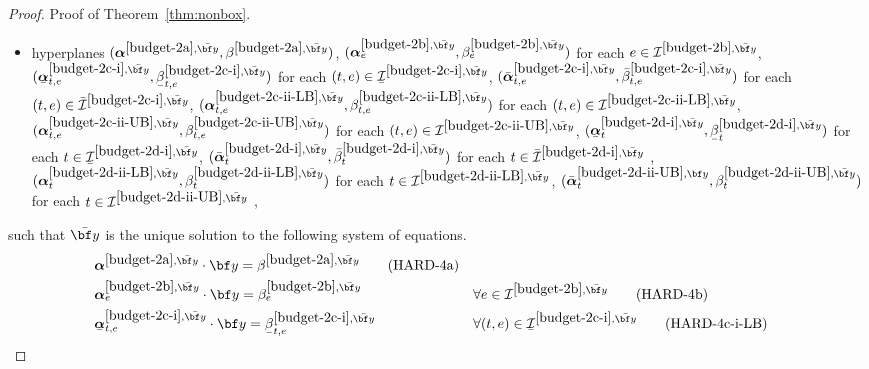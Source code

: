 \documentclass[nonblindrev,mnsc]{informs3} %
\newcommand{\by}{{\bf y}}
\newcommand{\balpha}{{\boldsymbol{\alpha}}}
\newcommand{\ubar}[1]{\text{\b{$#1$}}}
\begin{document}
\begin{APPENDICES}
\begin{proof}{Proof of Theorem~\ref{thm:nonbox}.}
\begin{itemize}
\item  hyperplanes $(\balpha^{\ref{budget-2a},\bar{\by}},\beta^{\ref{budget-2a},\bar{\by}})$, $(\balpha^{\ref{budget-2b},\bar{\by}}_e,\beta^{\ref{budget-2b},\bar{\by}}_e)$ for each $e \in {\mathcal{I}}^{\ref{budget-2b},\bar{\by}}$, 
$(\ubar{\balpha}^{\ref{budget-2c-i},\bar{\by}}_{t,e},\ubar{\beta}^{\ref{budget-2c-i},\bar{\by}}_{t,e})$ for each $(t,e) \in \ubar{\mathcal{I}}^{\ref{budget-2c-i},\bar{\by}}$, 
  $(\bar{\balpha}^{\ref{budget-2c-i},\bar{\by}}_{t,e},\bar{\beta}^{\ref{budget-2c-i},\bar{\by}}_{t,e})$ for each $(t,e) \in \bar{\mathcal{I}}^{\ref{budget-2c-i},\bar{\by}}$,
  $({\balpha}^{\ref{budget-2c-ii-LB},\bar{\by}}_{t,e},{\beta}^{\ref{budget-2c-ii-LB},\bar{\by}}_{t,e})$ for each $(t,e) \in {\mathcal{I}}^{\ref{budget-2c-ii-LB},\bar{\by}}$, 
  $({\balpha}^{\ref{budget-2c-ii-UB},\bar{\by}}_{t,e},{\beta}^{\ref{budget-2c-ii-UB},\bar{\by}}_{t,e})$ for each $(t,e) \in {\mathcal{I}}^{\ref{budget-2c-ii-UB},\bar{\by}}$,
  $(\ubar{\balpha}^{\ref{budget-2d-i},\bar{\by}}_{t},\ubar{\beta}^{\ref{budget-2d-i},\bar{\by}}_{t})$ for each $t \in \ubar{\mathcal{I}}^{\ref{budget-2d-i}, \bar{\by}}$, 
  $(\bar{\balpha}^{\ref{budget-2d-i},\bar{\by}}_{t},\bar{\beta}^{\ref{budget-2d-i},\bar{\by}}_{t})$ for each $t \in \bar{\mathcal{I}}^{\ref{budget-2d-i}, \bar{\by}}$ ,
  $({\balpha}^{\ref{budget-2d-ii-LB},\bar{\by}}_{t},{\beta}^{\ref{budget-2d-ii-LB},\bar{\by}}_{t})$ for each $t \in {\mathcal{I}}^{\ref{budget-2d-ii-LB}, \bar{\by}}$, 
  $(\bar{\balpha}^{\ref{budget-2d-ii-UB},{\by}}_{t},{\beta}^{\ref{budget-2d-ii-UB},\bar{\by}}_{t})$ for each $t \in {\mathcal{I}}^{\ref{budget-2d-ii-UB}, \bar{\by}}$ ,
  \end{itemize}
such that $\bar{\by}$ is the unique solution to  the following system of equations. %
\begin{align}
&\balpha^{\ref{budget-2a},\bar{\by}} \cdot \by = \beta^{\ref{budget-2a},\bar{\by}}  \tag{HARD-4a} \label{line:budget_hard_5a} \\
 &\balpha^{\ref{budget-2b},\bar{\by}}_e \cdot \by = \beta^{\ref{budget-2b},\bar{\by}}_e && \forall e \in \mathcal{I}^{\ref{budget-2b},\bar{\by}}\tag{HARD-4b} \label{line:budget_hard_5b}\\
&\ubar{\balpha}^{\ref{budget-2c-i},\bar{\by}}_{t,e} \cdot \by = \ubar{\beta}^{\ref{budget-2c-i},\bar{\by}}_{t,e} && \forall (t,e) \in  \ubar{\mathcal{I}}^{\ref{budget-2c-i},\bar{\by}}  \tag{HARD-4c-i-LB} \label{line:budget_hard_5c_lb}\\

\end{align}
\end{proof}
\end{APPENDICES}
\end{document}
